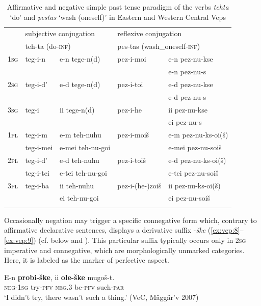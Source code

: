 \documentclass[output=paper,colorlinks=true, citecolor=brown]{langscibook}
\begin{document}
\begin{table}
\centering
\begin{tabularx}{\textwidth}{lllll}
\lsptoprule
& \multicolumn{2}{l}{subjective conjugation} &  \multicolumn{2}{l}{reflexive conjugation} \\
& \multicolumn{2}{l}{teh-ta (do\textsc{{}-inf})} &  \multicolumn{2}{l}{pes-tas (wash\_oneself\textsc{{}-inf})} \\
\midrule
\textsc{1sg} & teg-i-n & {e-n tege-n(d)} & pez-i-moi & e-n pez-nu-kse \\
&&&& e-n pez-nu-s \\
\textsc{2sg} & teg-i-d’ & {e-d tege-n(d)} & pez-i-toi &{e-d pez-nu-kse} \\
&&&& e-d pez-nu-s \\
\textsc{3sg} & teg-i & {ii tege-n(d)} & pez-i-he & {ii pez-nu-kse} \\
&&&&  ei pez-nu-s \\
\textsc{1pl} & teg-i-m & {e-m teh-nuhu} & pez-i-moiš & {e-m pez-nu-ks-oi(š)} \\
& teg-i-mei & e-mei teh-nu-goi && e-mei pez-nu-soiš \\
\textsc{2pl} & teg-i-d’& {e-d teh-nuhu} & pez-i-toiš & {e-d pez-nu-ks-oi(š)} \\
& teg-i-tei & e-tei teh-nu-goi && e-tei pez-nu-soiš \\
\textsc{3pl} & teg-i-ba & {ii teh-nuhu} & pez-i-(he-)zoiš & {ii pez-nu-ks-oi(š)} \\
&& ei teh-nu-goi && ei pez-nu-soiš \\
\lspbottomrule
\end{tabularx}
\caption{Affirmative and negative simple past tense paradigm of the verbs \textit{tehta} ‘do’ and \textit{pestas} ‘wash (oneself)’ in Eastern and Western Central Veps \citep[254--255, 268]{Zaitseva2001}}
\label{tab:vep:2}
\end{table}

Occasionally negation may trigger a specific connegative form which, contrary to affirmative declarative sentences, displays a derivative suffix {}-\textit{ške} (\ref{ex:vep:8}--\ref{ex:vep:9}) (cf. below  and ). This particular suffix typically occurs only in \textsc{2sg} imperative and connegative, which are morphologically unmarked categories. Here, it is labeled as the marker of perfective aspect.

\ea
    \label{ex:vep:8}
    \gll E-n  \textbf{probi-ške}, ii \textbf{ole-ške} mugoš-t. \\
         \textsc{neg-1sg}  try-\textsc{pfv} \textsc{neg.3} be-\textsc{pfv} such-\textsc{par}\\
    \glt ‘I didn’t try, there wasn’t such a thing.’ (VeC, Mäggär’v 2007)
\z 
\end{document}
